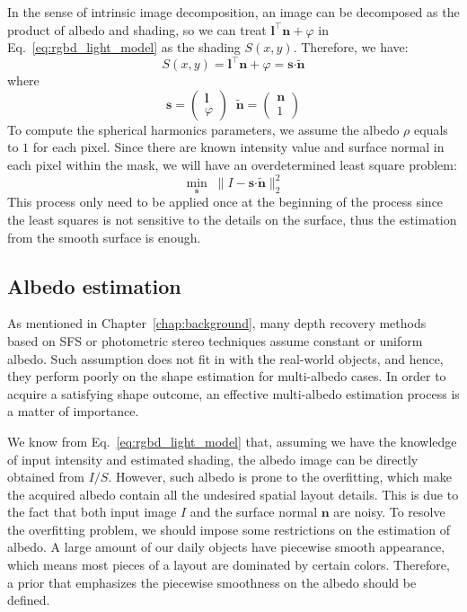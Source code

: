 In the sense of intrinsic image decomposition, an image can be decomposed as the product of albedo and shading, so we can treat $\mathbf{l}^\top \mathbf{n} + \varphi$ in Eq.~\ref{eq:rgbd_light_model} as the shading $S(x,y)$.
Therefore, we have:
\begin{equation}
S(x,y) = \mathbf{l}^\top \mathbf{n} + \varphi = \mathbf{s} \boldsymbol{\cdot} \tilde{\mathbf{n}}
\end{equation}
where
\begin{equation}
\mathbf{s} = \begin{pmatrix}\mathbf{l} \\ \varphi \end{pmatrix}   \; \; \tilde{\mathbf{n}} = \begin{pmatrix}\mathbf{n} \\ 1\end{pmatrix}  
\end{equation}
To compute the spherical harmonics parameters, we assume the albedo $\rho$ equals to $1$ for each pixel. 
Since there are known intensity value and surface normal in each pixel within the mask, we will have an overdetermined least square problem: 
\begin{equation}\label{eq:rgbd_light_estimate}
\min_{\mathbf{s}} \; \lVert I - \mathbf{s} \boldsymbol{\cdot} \tilde{\mathbf{n}} \rVert^2_2
\end{equation}
This process only need to be applied once at the beginning of the process since the least squares is not sensitive to the details on the surface, thus the estimation from the smooth surface is enough.

\subsection{Albedo estimation}
As mentioned in Chapter~\ref{chap:background}, many depth recovery methods based on SFS or photometric stereo techniques assume constant or uniform albedo.
Such assumption does not fit in with the real-world objects, and hence, they perform poorly on the shape estimation for multi-albedo cases.
In order to acquire a satisfying shape outcome, an effective multi-albedo estimation process is a matter of importance.

We know from Eq.~\ref{eq:rgbd_light_model} that, assuming we have the knowledge of input intensity and estimated shading, the albedo image can be directly obtained from $I/S$.
However, such albedo is prone to the overfitting, which make the acquired albedo contain all the undesired spatial layout details.
This is due to the fact that both input image $I$ and the surface normal $\mathbf{n}$ are noisy.
To resolve the overfitting problem, we should impose some restrictions on the estimation of albedo.
A large amount of our daily objects have piecewise smooth appearance, which means most pieces of a layout are dominated by certain colors.
Therefore, a prior that emphasizes the piecewise smoothness on the albedo should be defined.

